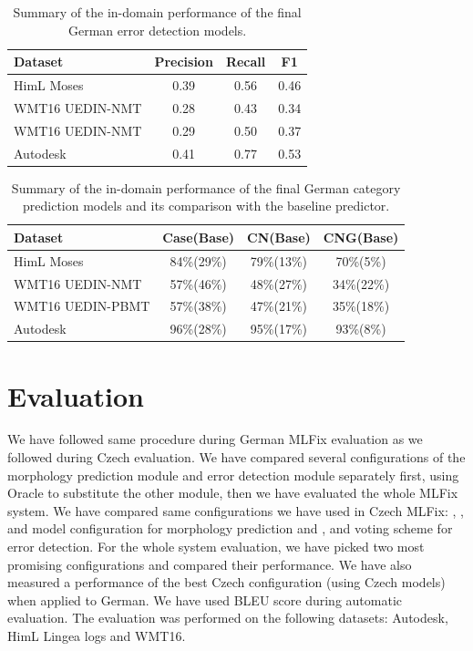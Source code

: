 \begin{table}[t]
\centering
\small

\begin{tabular}{l|ccc}
Dataset  &  Precision  &  Recall  &  F1  \\
\hline
HimL Moses  &  0.39  &  0.56  &  0.46  \\
WMT16 UEDIN-NMT  &  0.28  &  0.43  &  0.34  \\
WMT16 UEDIN-NMT  &  0.29  &  0.50  &  0.37  \\
Autodesk  &  0.41  &  0.77  &  0.53  \\
\end{tabular}
\caption{
    Summary of the in-domain performance of the final German error detection models.
}
\label{wf_de-summary}
\end{table}

\begin{table}[t]
\centering
\small

\begin{tabular}{l|ccc}
Dataset  &  Case(Base)  &  CN(Base)  & CNG(Base)  \\
\hline
HimL Moses  &  84\%(29\%)  &  79\%(13\%)  &  70\%(5\%)  \\
WMT16 UEDIN-NMT  &  57\%(46\%)  &  48\%(27\%)  &  34\%(22\%)  \\
WMT16 UEDIN-PBMT  &  57\%(38\%)  &  47\%(21\%)  &  35\%(18\%)\\
Autodesk  &  96\%(28\%)  &  95\%(17\%)  &  93\%(8\%)  \\

\end{tabular}
\caption{
    Summary of the in-domain performance of the final German category prediction models
	and its comparison with the baseline predictor.
}
\label{cats_de-summary}
\end{table}



\section{Evaluation}

We have followed same procedure during German MLFix evaluation as we followed during
Czech evaluation. We have compared several configurations of the morphology prediction
module and error detection module separately first, using Oracle to substitute the other
module, then we have evaluated the whole MLFix system. We have compared same configurations
we have used in Czech MLFix: , ,  and  model configuration for morphology
prediction and ,  and  voting scheme for error
detection. For the whole system evaluation, we have picked two most promising configurations
and compared their performance. We have also measured a performance of the best Czech configuration
(using Czech models) when applied to German. We have used BLEU score during automatic evaluation.
The evaluation was performed on the following datasets: Autodesk, HimL Lingea logs and WMT16.

